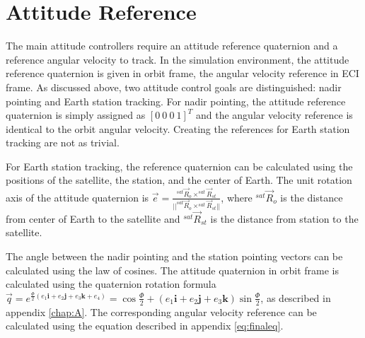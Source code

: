 \section{Attitude Reference}

The main attitude controllers require an attitude reference quaternion and a reference angular velocity to track. In the simulation environment, the attitude reference quaternion is given in orbit frame, the angular velocity reference in ECI frame. As discussed above, two attitude control goals are distinguished: nadir pointing and Earth station tracking. For nadir pointing, the attitude reference quaternion is simply assigned as $[0 \ 0 \ 0 \ 1]^T$ and the angular velocity reference is identical to the orbit angular velocity. Creating the references for Earth station tracking are not as trivial.

For Earth station tracking, the reference quaternion can be calculated using the positions of the satellite, the station, and the center of Earth. The unit rotation axis of the attitude quaternion is $\vec{e} = \frac{^{sat}\vec{R}_{o} \times ^{sat}\vec{R}_{st}}{||^{sat}\vec{R}_{o} \times ^{sat}\vec{R}_{st}||}$, where ${^{sat}\vec{R}_{o}}$ is the distance from center of Earth to the satellite and $^{sat}\vec{R}_{st}$ is the distance from station to the satellite. 

The angle between the nadir pointing and the station pointing vectors can be calculated using the law of cosines. The attitude quaternion in orbit frame is calculated using the quaternion rotation formula $ \vec q = e^{\frac{\Phi}{2} (e_1 \textbf{i}+ e_2 \textbf{j} + e_3 \textbf{k} + e_4)} = \cos \frac{\Phi}{2} + (e_1 \textbf{i}+ e_2 \textbf{j} + e_3 \textbf{k}) \sin \frac{\Phi}{2}$, as described in appendix \ref{chap:A}. The corresponding angular velocity reference can be calculated using the equation described in appendix \ref{eq:finaleq}.



%
%
%

